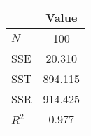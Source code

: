 \begin{tabular}{lc}
 & Value \\ 
\hline$N$   & 100 \\ 
SSE   & 20.310 \\ 
SST   & 894.115 \\ 
SSR   & 914.425 \\ 
$R^2$ & 0.977 \\ 
\hline\end{tabular}
